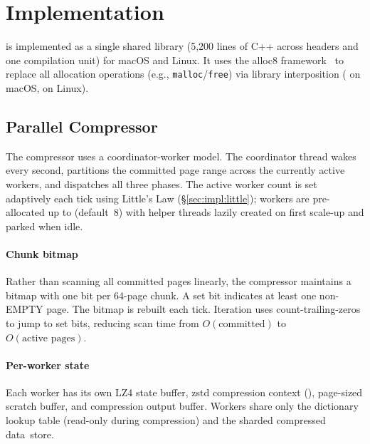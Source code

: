 \section{Implementation}
\label{sec:impl}

\sys is implemented as a single shared library (5,200 lines of C++
across headers and one compilation unit) for macOS and Linux. It uses the alloc8
framework~\cite{berger2025alloc8} to replace all allocation operations
(e.g., \texttt{malloc}/\texttt{free}) via library interposition
( on macOS,
 on Linux).

\subsection{Parallel Compressor}
\label{sec:impl:parallel}

The compressor uses a coordinator-worker model.  The coordinator
thread wakes every second, partitions the committed page range
across the currently active workers, and dispatches all three
phases.  The active worker count is set adaptively each tick using
Little's Law (\S\ref{sec:impl:little}); workers are pre-allocated
up to  (default~8) with helper threads
lazily created on first scale-up and parked when
idle.

\paragraph{Chunk bitmap}  Rather than scanning all committed
pages linearly, the compressor maintains a bitmap with one bit per
64-page chunk.  A set bit indicates at least one non-EMPTY page.
The bitmap is rebuilt each tick.  Iteration uses
count-trailing-zeros to jump to set bits, reducing scan time from
$O(\text{committed})$ to $O(\text{active pages})$.

\paragraph{Per-worker state}  Each worker has its own LZ4 state
buffer, zstd compression context (), page-sized
scratch buffer, and compression output buffer.  Workers share only the
dictionary lookup table (read-only during compression) and the
sharded compressed data~store.

